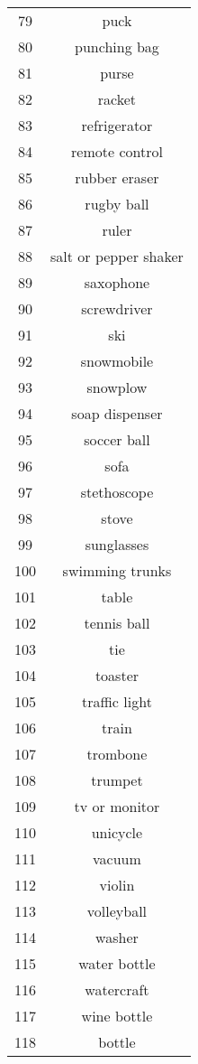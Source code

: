 \begin{multicols*}{4}
\begin{supertabular}{c|c}
79  & puck \\
80  & punching bag \\
81  & purse \\
82  & racket \\
83  & refrigerator \\
84  & remote control \\
85  & rubber eraser \\
86  & rugby ball \\
87  & ruler \\
88  & salt or pepper shaker \\
89  & saxophone \\
90  & screwdriver \\
91  & ski \\
92  & snowmobile \\
93  & snowplow \\
94  & soap dispenser \\
95  & soccer ball \\
96  & sofa \\
97  & stethoscope \\
98  & stove \\
99  & sunglasses \\
100 & swimming trunks \\
101 & table \\
102 & tennis ball \\
103 & tie \\
104 & toaster \\
105 & traffic light \\
106 & train \\
107 & trombone \\
108 & trumpet \\
109 & tv or monitor \\
110 & unicycle \\
111 & vacuum \\
112 & violin \\
113 & volleyball \\
114 & washer \\
115 & water bottle \\
116 & watercraft \\
117 & wine bottle \\
118 & bottle \\
\end{supertabular}
\end{multicols*}
